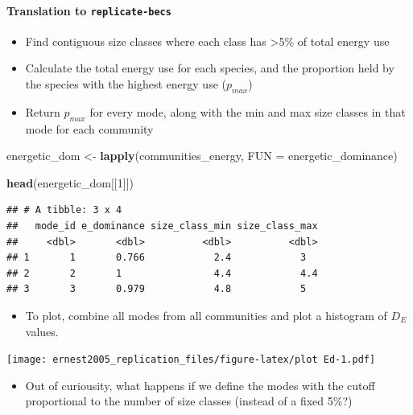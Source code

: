\documentclass[]{article}
\newenvironment{Shaded}{\begin{snugshade}}{\end{snugshade}}
\newcommand{\KeywordTok}[1]{\textcolor[rgb]{0.13,0.29,0.53}{\textbf{#1}}}
\newcommand{\DataTypeTok}[1]{\textcolor[rgb]{0.13,0.29,0.53}{#1}}
\newcommand{\DecValTok}[1]{\textcolor[rgb]{0.00,0.00,0.81}{#1}}
\newcommand{\StringTok}[1]{\textcolor[rgb]{0.31,0.60,0.02}{#1}}
\newcommand{\NormalTok}[1]{#1}
\providecommand{\tightlist}{%
  \setlength{\itemsep}{0pt}\setlength{\parskip}{0pt}}
\let\oldparagraph\paragraph
\renewcommand{\paragraph}[1]{\oldparagraph{#1}\mbox{}}
\begin{document}
\paragraph{\texorpdfstring{Translation to
\texttt{replicate-becs}}{Translation to replicate-becs}}\label{translation-to-replicate-becs-3}

\begin{itemize}
\tightlist
\item
  Find contiguous size classes where each class has \textgreater{}5\% of
  total energy use
\item
  Calculate the total energy use for each species, and the proportion
  held by the species with the highest energy use (\(p_{max}\))
\item
  Return \(p_{max}\) for every mode, along with the min and max size
  classes in that mode for each community
\end{itemize}

\begin{Shaded}
\begin{Highlighting}[]
\NormalTok{energetic_dom <-}\StringTok{ }\KeywordTok{lapply}\NormalTok{(communities_energy, }\DataTypeTok{FUN =}\NormalTok{ energetic_dominance) }

\KeywordTok{head}\NormalTok{(energetic_dom[[}\DecValTok{1}\NormalTok{]])}
\end{Highlighting}
\end{Shaded}

\begin{verbatim}
## # A tibble: 3 x 4
##   mode_id e_dominance size_class_min size_class_max
##     <dbl>       <dbl>          <dbl>          <dbl>
## 1       1       0.766            2.4            3  
## 2       2       1                4.4            4.4
## 3       3       0.979            4.8            5
\end{verbatim}

\begin{itemize}
\tightlist
\item
  To plot, combine all modes from all communities and plot a histogram
  of \(D_E\) values.
\end{itemize}

\texttt{[image: ernest2005\_replication\_files/figure-latex/plot Ed-1.pdf]}

\begin{itemize}
\tightlist
\item
  Out of curiousity, what happens if we define the modes with the cutoff
  proportional to the number of size classes (instead of a fixed 5\%?)
\end{itemize}
\end{document}
